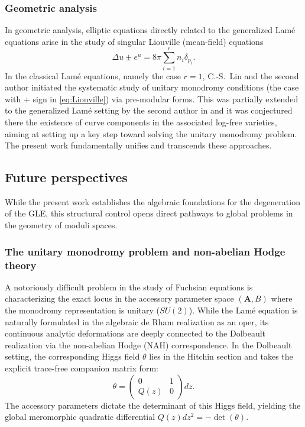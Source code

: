 \documentclass[11pt]{amsart}
\theoremstyle{remark}
\numberwithin{equation}{section}
\begin{document}
\subsubsection{Geometric analysis} In geometric analysis, elliptic equations directly related to the generalized Lam\'e equations arise in the study of singular Liouville (mean-field) equations  \begin{equation} \label{eq:Liouville}
\Delta u \pm e^u = 8\pi \sum_{i=1}^r n_i \delta_{p_i}.
\end{equation}
In the classical Lam\'e equations, namely the case $r = 1$, C.-S.~Lin and the second author \cite{Lin_Wang_2010, Lin_Wang_2017} initiated the systematic study of unitary monodromy conditions (the case with $+$ sign in \eqref{eq:Liouville}) via pre-modular forms. This was partially extended to the generalized Lam\'e setting by the second author in \cite{Wang_2020} and it was conjectured there the existence of curve components in the associated log-free varieties, aiming at setting up a key step toward solving the unitary monodromy problem. The present work fundamentally unifies and transcends these approaches. 


\subsection{Future perspectives}

While the present work establishes the algebraic foundations for the degeneration of the GLE, this structural control opens direct pathways to global problems in the geometry of moduli spaces. 

\subsubsection{The unitary monodromy problem and non-abelian Hodge theory} 
A notoriously difficult problem in the study of Fuchsian equations is characterizing the exact locus in the accessory parameter space $(\mathbf{A}, B)$ where the monodromy representation is unitary ($SU(2)$). While the Lamé equation is naturally formulated in the algebraic de Rham realization as an oper, its continuous analytic deformations are deeply connected to the Dolbeault realization via the non-abelian Hodge (NAH) correspondence. In the Dolbeault setting, the corresponding Higgs field $\theta$ lies in the Hitchin section and takes the explicit trace-free companion matrix form:
\begin{equation} \label{eq:Higgs_field}
\theta = \begin{pmatrix} 0 & 1 \\ Q(z) & 0 \end{pmatrix} dz.
\end{equation}
The accessory parameters dictate the determinant of this Higgs field, yielding the global meromorphic quadratic differential $Q(z) dz^2 = -\det(\theta)$. 
\end{document}

